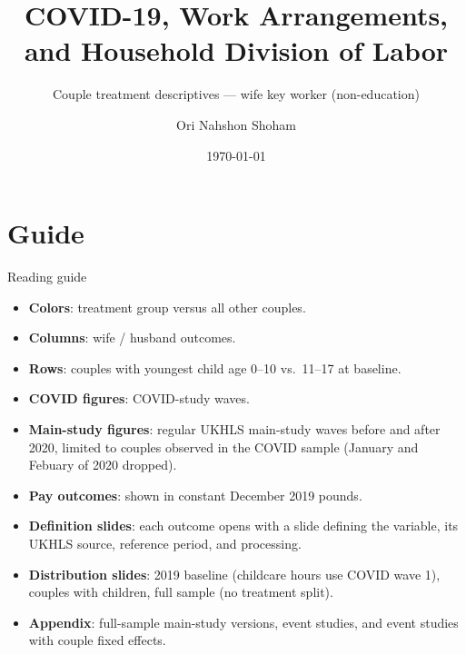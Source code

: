 \documentclass[aspectratio=169,11pt]{beamer}
\title{COVID-19, Work Arrangements, and Household Division of Labor}
\subtitle{Couple treatment descriptives --- wife key worker (non-education)}
\author{Ori Nahshon Shoham}
\date{\today}
\begin{document}
\begin{frame}
\titlepage
\end{frame}

\section{Guide}

\begin{frame}{Reading guide}
\small
\begin{itemize}
  \item \textbf{Colors}: treatment group versus all other couples.
  \item \textbf{Columns}: wife / husband outcomes.
  \item \textbf{Rows}: couples with youngest child age 0--10 vs.\ 11--17 at baseline.
  \item \textbf{COVID figures}: COVID-study waves.
  \item \textbf{Main-study figures}: regular UKHLS main-study waves before and after 2020, limited to couples observed in the COVID sample (January and Febuary of 2020 dropped).
  \item \textbf{Pay outcomes}: shown in constant December 2019 pounds.
  \item \textbf{Definition slides}: each outcome opens with a slide defining the variable, its UKHLS source, reference period, and processing.
  \item \textbf{Distribution slides}: 2019 baseline (childcare hours use COVID wave 1), couples with children, full sample (no treatment split).
  \item \textbf{Appendix}: full-sample main-study versions, event studies, and event studies with couple fixed effects.
\end{itemize}

\end{frame}
\end{document}
